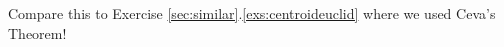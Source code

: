 
Compare this to Exercise \ref*{sec:similar}.\ref{exs:centroideuclid} where we used Ceva's Theorem!

\smallbreak




